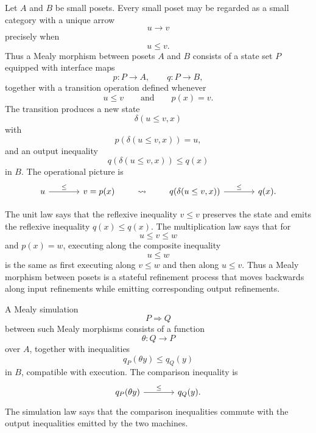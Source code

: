\begin{example}
\label{example:posets-as-internal-categories}   
    Let \(A\) and \(B\) be small posets. Every small poset may be regarded as a small category with a unique arrow
    \[
        u\to v
    \]
    precisely when
    \[
        u\leq v.
    \]
    Thus a Mealy morphism between posets \(A\) and \(B\) consists of a state set \(P\) equipped with interface maps
    \[
        p:P\to A,
        \qquad
        q:P\to B,
    \]
    together with a transition operation defined whenever
    \[
        u\leq v
        \qquad
        \text{and}
        \qquad
        p(x)=v.
    \]
    The transition produces a new state
    \[
        \delta(u\leq v,x)
    \]
    with
    \[
        p(\delta(u\leq v,x))=u,
    \]
    and an output inequality
    \[
        q(\delta(u\leq v,x))\leq q(x)
    \]
    in \(B\). The operational picture is
    \[
        \begin{tikzcd}[column sep=large]
                u 
                    \arrow[r, "\leq"] 
            & 
                v=p(x)
        \end{tikzcd}
        \qquad\leadsto\qquad
        \begin{tikzcd}[column sep=large]
                q(\delta(u\leq v,x))
                    \arrow[r, "\leq"]
            &
                q(x).
        \end{tikzcd}
    \]
    
    The unit law says that the reflexive inequality \(v\leq v\) preserves the state and emits the reflexive inequality \(q(x)\leq q(x)\). The multiplication law says that for
    \[
        u\leq v\leq w
    \]
    and \(p(x)=w\), executing along the composite inequality
    \[
        u\leq w
    \]
    is the same as first executing along \(v\leq w\) and then along \(u\leq v\). Thus a Mealy morphism between posets is a stateful refinement process that moves backwards along input refinements while emitting corresponding output refinements.
    
    A Mealy simulation
    \[
        P\Rightarrow Q
    \]
    between such Mealy morphisms consists of a function
    \[
        \theta:Q\to P
    \]
    over \(A\), together with inequalities
    \[
        q_P(\theta y)\leq q_Q(y)
    \]
    in \(B\), compatible with execution. The comparison inequality is
    \[
        \begin{tikzcd}[column sep=large]
                q_P(\theta y)
                    \arrow[r, "\leq"]
            &
                q_Q(y).
        \end{tikzcd}
    \]
    The simulation law says that the comparison inequalities commute with the output inequalities emitted by the two machines.
    

\end{example}
